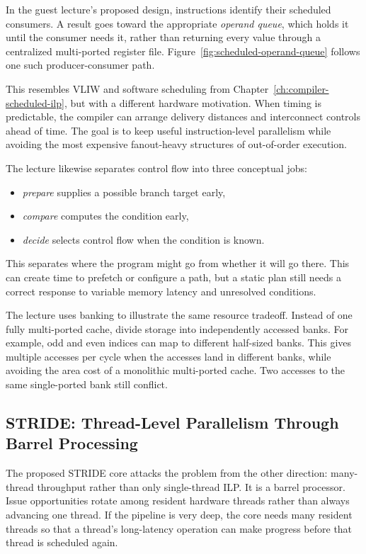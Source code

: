 In the guest lecture's proposed design, instructions identify their scheduled consumers.
A result goes toward the appropriate \textit{operand queue}, which holds it until the consumer needs it, rather than returning every value through a centralized multi-ported register file.
Figure~\ref{fig:scheduled-operand-queue} follows one such producer-consumer path.



This resembles VLIW and software scheduling from Chapter~\ref{ch:compiler-scheduled-ilp}, but with a different hardware motivation.
When timing is predictable, the compiler can arrange delivery distances and interconnect controls ahead of time.
The goal is to keep useful instruction-level parallelism while avoiding the most expensive fanout-heavy structures of out-of-order execution.

The lecture likewise separates control flow into three conceptual jobs:
\begin{itemize}
    \item \textit{prepare} supplies a possible branch target early,
    \item \textit{compare} computes the condition early,
    \item \textit{decide} selects control flow when the condition is known.
\end{itemize}
This separates where the program might go from whether it will go there.
This can create time to prefetch or configure a path, but a static plan still needs a correct response to variable memory latency and unresolved conditions.

The lecture uses banking to illustrate the same resource tradeoff.
Instead of one fully multi-ported cache, divide storage into independently accessed banks.
For example, odd and even indices can map to different half-sized banks.
This gives multiple accesses per cycle when the accesses land in different banks, while avoiding the area cost of a monolithic multi-ported cache.
Two accesses to the same single-ported bank still conflict.

\subsection{STRIDE: Thread-Level Parallelism Through Barrel Processing}\label{subsec:appd-stride}
The proposed STRIDE core attacks the problem from the other direction: many-thread throughput rather than only single-thread ILP.
It is a barrel processor.
Issue opportunities rotate among resident hardware threads rather than always advancing one thread.
If the pipeline is very deep, the core needs many resident threads so that a thread's long-latency operation can make progress before that thread is scheduled again.

